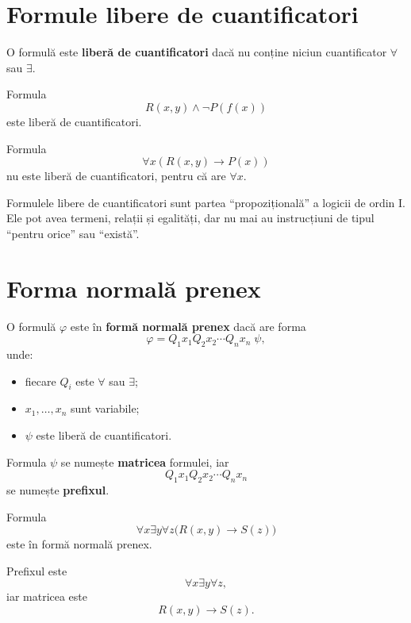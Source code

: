 \section{Formule libere de cuantificatori}

\begin{definition}
	O formulă este \textbf{liberă de cuantificatori} dacă nu conține niciun cuantificator \( \forall \) sau \( \exists \).
\end{definition}

\begin{eg}
	Formula
	\[
		R(x,y) \land \neg P(f(x))
	\]
	este liberă de cuantificatori.

	Formula
	\[
		\forall x(R(x,y) \to P(x))
	\]
	nu este liberă de cuantificatori, pentru că are \( \forall x \).
\end{eg}

Formulele libere de cuantificatori sunt partea ``propozițională'' a logicii de ordin I. Ele pot avea termeni, relații și egalități, dar nu mai au instrucțiuni de tipul ``pentru orice'' sau ``există''.

\section{Forma normală prenex}

\begin{definition}
	O formulă \( \varphi \) este în \textbf{formă normală prenex} dacă are forma
	\[
		\varphi = Q_1x_1 Q_2x_2 \cdots Q_nx_n \; \psi,
	\]
	unde:
	\begin{itemize}
		\item fiecare \(Q_i\) este \( \forall \) sau \( \exists \);
		\item \(x_1,\dots,x_n\) sunt variabile;
		\item \( \psi \) este liberă de cuantificatori.
	\end{itemize}

	Formula \( \psi \) se numește \textbf{matricea} formulei, iar
	\[
		Q_1x_1 Q_2x_2 \cdots Q_nx_n
	\]
	se numește \textbf{prefixul}.
\end{definition}

\begin{eg}
	Formula
	\[
		\forall x \exists y \forall z \big(R(x,y) \to S(z)\big)
	\]
	este în formă normală prenex.

	Prefixul este
	\[
		\forall x \exists y \forall z,
	\]
	iar matricea este
	\[
		R(x,y) \to S(z).
	\]
\end{eg}

